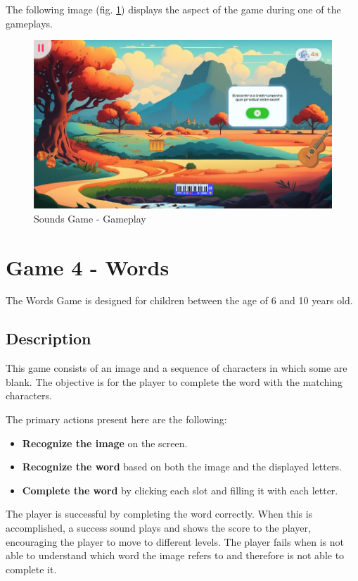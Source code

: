 The following image (fig. \ref{fig:soundsGameplay}) displays the aspect of the game during one of the gameplays.
\begin{figure}[H]
    \centering
    \includegraphics[scale=0.45]{Chapters/gameplay/SoundsGame.jpg}
    \caption{Sounds Game - Gameplay}
    \label{fig:soundsGameplay}    
\end{figure}

\section{Game 4 - Words}
\label{c3Words}

The Words Game is designed for children between the age of 6 and 10 years old.

\subsection*{Description}
This game consists of an image and a sequence of characters in which some are blank. The objective is for the player to complete the word with the matching characters.

The primary actions present here are the following:

\begin{itemize}
    \item \textbf{Recognize the image} on the screen.
    \item \textbf{Recognize the word} based on both the image and the displayed letters.
    \item \textbf{Complete the word} by clicking each slot and filling it with each letter.
\end{itemize}

The player is successful by completing the word correctly. When this is accomplished, a success sound plays and shows the score to the player, encouraging the player to move to different levels.
The player fails when is not able to understand which word the image refers to and therefore is not able to complete it.

